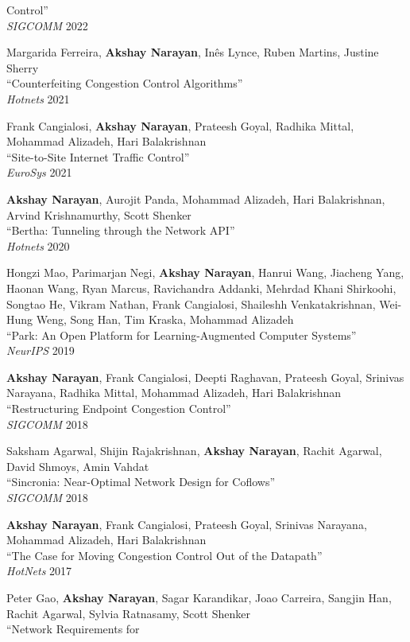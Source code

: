 \documentclass{article}
\newcommand{\identity}[1]{#1}
\begin{document}
Control{''}\identity{\\}\identity{\emph{SIGCOMM}}\identity{ }\identity{2022}\identity{\item}Margarida Ferreira, \identity{\textbf{Akshay Narayan}}, In\^{e}s Lynce, Ruben Martins, Justine Sherry\identity{\\}{``}Counterfeiting Congestion Control Algorithms{''}\identity{\\}\identity{\emph{Hotnets}}\identity{ }\identity{2021}\identity{\item}Frank Cangialosi, \identity{\textbf{Akshay Narayan}}, Prateesh Goyal, Radhika Mittal, Mohammad Alizadeh, Hari Balakrishnan\identity{\\}{``}Site{-}to{-}Site Internet Traffic Control{''}\identity{\\}\identity{\emph{EuroSys}}\identity{ }\identity{2021}\identity{\item}\identity{\textbf{Akshay Narayan}}, Aurojit Panda, Mohammad Alizadeh, Hari Balakrishnan, Arvind Krishnamurthy, Scott Shenker\identity{\\}{``}Bertha: Tunneling through the Network API{''}\identity{\\}\identity{\emph{Hotnets}}\identity{ }\identity{2020}\identity{\item}Hongzi Mao, Parimarjan Negi, \identity{\textbf{Akshay Narayan}}, Hanrui Wang, Jiacheng Yang, Haonan Wang, Ryan Marcus, Ravichandra Addanki, Mehrdad Khani Shirkoohi, Songtao He, Vikram Nathan, Frank Cangialosi, Shaileshh Venkatakrishnan, Wei{-}Hung Weng, Song Han, Tim Kraska, Mohammad Alizadeh\identity{\\}{``}Park: An Open Platform for Learning{-}Augmented Computer Systems{''}\identity{\\}\identity{\emph{NeurIPS}}\identity{ }\identity{2019}\identity{\item}\identity{\textbf{Akshay Narayan}}, Frank Cangialosi, Deepti Raghavan, Prateesh Goyal, Srinivas Narayana, Radhika Mittal, Mohammad Alizadeh, Hari Balakrishnan\identity{\\}{``}Restructuring Endpoint Congestion Control{''}\identity{\\}\identity{\emph{SIGCOMM}}\identity{ }\identity{2018}\identity{\item}Saksham Agarwal, Shijin Rajakrishnan, \identity{\textbf{Akshay Narayan}}, Rachit Agarwal, David Shmoys, Amin Vahdat\identity{\\}{``}Sincronia: Near{-}Optimal Network Design for Coflows{''}\identity{\\}\identity{\emph{SIGCOMM}}\identity{ }\identity{2018}\identity{\item}\identity{\textbf{Akshay Narayan}}, Frank Cangialosi, Prateesh Goyal, Srinivas Narayana, Mohammad Alizadeh, Hari Balakrishnan\identity{\\}{``}The Case for Moving Congestion Control Out of the Datapath{''}\identity{\\}\identity{\emph{HotNets}}\identity{ }\identity{2017}\identity{\item}Peter Gao, \identity{\textbf{Akshay Narayan}}, Sagar Karandikar, Joao Carreira, Sangjin Han, Rachit Agarwal, Sylvia Ratnasamy, Scott Shenker\identity{\\}{``}Network Requirements for 
\end{document}
